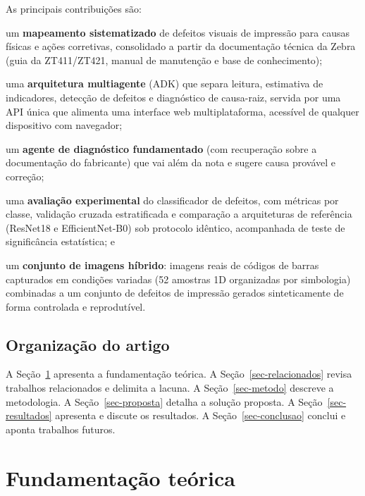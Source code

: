 \documentclass[
	article,			%
	11pt,				%
	oneside,			%
	a4paper,			%
	english,			%
	brazilian,			%
	sumario=tradicional
	]{abntex2}
\begin{document}
As principais contribuições são:
\begin{alineas}
	\item um \textbf{mapeamento sistematizado} de defeitos visuais de impressão
	para causas físicas e ações corretivas, consolidado a partir da documentação
	técnica da Zebra (guia da ZT411/ZT421, manual de manutenção e base de
	conhecimento);
	\item uma \textbf{arquitetura multiagente} (ADK) que separa leitura,
	estimativa de indicadores, detecção de defeitos e diagnóstico de causa-raiz,
	servida por uma API única que alimenta uma interface web multiplataforma,
	acessível de qualquer dispositivo com navegador;
	\item um \textbf{agente de diagnóstico fundamentado} (com recuperação sobre a
	documentação do fabricante) que vai além da nota e sugere causa provável e
	correção;
	\item uma \textbf{avaliação experimental} do classificador de defeitos, com
	métricas por classe, validação cruzada estratificada e comparação a arquiteturas
	de referência (ResNet18 e EfficientNet-B0) sob protocolo idêntico, acompanhada de
	teste de significância estatística; e
	\item um \textbf{conjunto de imagens híbrido}: imagens reais de códigos de
	barras capturados em condições variadas (52 amostras 1D organizadas por
	simbologia) combinadas a um conjunto de defeitos de impressão gerados
	sinteticamente de forma controlada e reprodutível.
\end{alineas}

\subsection{Organização do artigo}

A Seção~\ref{sec-fund} apresenta a fundamentação teórica. A
Seção~\ref{sec-relacionados} revisa trabalhos relacionados e delimita a lacuna. A
Seção~\ref{sec-metodo} descreve a metodologia. A Seção~\ref{sec-proposta} detalha
a solução proposta. A Seção~\ref{sec-resultados} apresenta e discute os
resultados. A Seção~\ref{sec-conclusao} conclui e aponta trabalhos futuros.

\section{Fundamentação teórica}\label{sec-fund}
\end{document}

